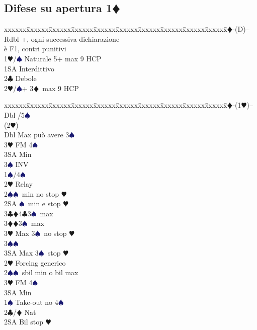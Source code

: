 \documentclass[a4paper,italian]{article}
\newcommand{\BC}{\textcolor{OliveGreen}{$\clubsuit$}}
\newcommand{\BD}{\textcolor{RedOrange}{$\vardiamondsuit$}}
\newcommand{\BH}{\textcolor{Red2}{$\varheartsuit${}}}
\newcommand{\BS}{\textcolor{MidnightBlue}{$\spadesuit${}}}
\newcommand{\pdfd}{\texorpdfstring{\BD{}}{D}}
\newenvironment{bidtable}
{\begin{tabbing}

    xxxxxx\=xxxxxx\=xxxxxx\=xxxxxx\=xxxxxx\=xxxxxx\=xxxxxx\=xxxxxx\=xxxxxx\=xxxxxx\=\kill}
{\end{tabbing} }%
\begin{document}
\newpage
\begin{multicols*}{2}

    \subsection{Difese su apertura 1\pdfd}

    \begin{bidtable}
        1\BD-(D)--\+\\
        Rdbl +, ogni successiva dichiarazione\+\\ è F1, contri punitivi\-\\
        1\BH/\BS \> Naturale 5+ max 9 HCP\\
        1SA \> Interdittivo\\
        2\BC \> Debole\\
        2\BH/\BS {}+ 3\BD\ max 9 HCP\-
    \end{bidtable}
    \begin{bidtable}
        1\BD-(1\BH)--\+\\
        Dbl /5\BS \+\\
        (2\BH)\+\\
        Dbl \> Max può avere 3\BS \\
        3\BH \> FM 4\BS \+\\
        3SA \> Min\-\\
        3\BS \> INV\-\\
        1\BS {}/4\BS \+\\
        2\BH \> Relay\+\\
        2\BS {}\BS\ min no stop \BH \\
        2SA \BS\ min e stop \BH \\
        3\BC {}\BD 4\BC 3\BS\ max\\
        3\BD {}\BD 3\BS\ max\\
        3\BH \> Max 3\BS\ no stop \BH \\
        3\BS {}\BS \\
        3SA \> Max 3\BS\ stop \BH \-\-\\
        2\BH \> Forcing generico\\
        2\BS {}\BS\ sbil min o bil max\\
        3\BH \> FM 4\BS \+\\
        3SA \> Min\-\-\\
        1\BS \> Take-out no 4\BS \\
        2\BC/\BD \> Nat\+\\
        2SA \> Bil stop \BH \\

\end{bidtable}
\end{multicols*}
\end{document}
